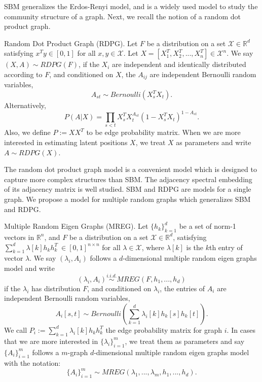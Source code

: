 \documentclass[10pt,journal,compsoc]{IEEEtran}
\newenvironment{definition}[1][Definition]{\begin{trivlist}
		\item[\hskip \labelsep {\bfseries #1}]}{\end{trivlist}}
\begin{document}
\noindent SBM generalizes the Erdos-Renyi model\cite{erdds1959random}, and is a widely used model to study the community structure of a graph\cite{karrer2011stochastic}\cite{lyzinski2015community}. Next, we recall the notion of a random dot product graph\cite{young2007random}. 

\begin{definition} Random Dot Product Graph (RDPG). Let $F$ be a distribution on a set $\mathcal{X} \in \mathbb{R}^d$ satisfying $x^T y \in [0, 1]$ for all $x, y \in \mathcal{X}$. Let $X=[X_1^T,X_2^T,...,X_n^T] \in \mathcal{X}^n$. We say $(X,A) \sim RDPG(F)$, if the $X_i$ are independent and identically distributed according to $F$, and conditioned on $X$, the $A_{ij}$ are independent Bernoulli random variables,
\[ A_{st} \sim Bernoulli(X_s^T X_t). \]
Alternatively,
\[ P(A|X) = \prod_{s<t} X_s^T X_t ^{ A_{st}} (1-X_s^T X_t)^{1- A_{st}}.\]
Also, we define $P:=XX^T$ to be edge probability matrix. When we are more interested in estimating latent positions $X$, we treat $X$ as parameters and write $A \sim RDPG(X)$.
\end{definition}
The random dot product graph model is a convenient model which is designed to capture more complex structures than SBM. The adjacency
spectral embedding of its adjacency matrix is well studied\cite{sussman2014consistent}. SBM and RDPG are models for a single graph. We propose a model for multiple random graphs which generalizes SBM and RDPG.
\begin{definition} Multiple Random Eigen Graphs (MREG). Let $\{h_k\}_{k=1}^{d}$ be a set of norm-1 vectors in $\mathbb{R}^{n}$, and  $F$ be a distribution on a set $\mathcal{X} \in \mathbb{R}^d$,  satisfying $\sum\limits_{k=1}^{d} \lambda [k] h_k  h_k^T \  \in [0, 1]^{n \times n} $ for all $\lambda \in \mathcal{X}$, where $\lambda[k]$ is the $k$th entry of vector $\lambda$. We say $(\lambda_i,A_i)$ follows a $d$-dimensional multiple random eigen graphs model and write
\[(\lambda_i,A_i) \overset{i.i.d.}{\sim} MREG(F,h_1,...,h_d)\]
if the $\lambda_i$ has distribution $F$, and conditioned on $\lambda_i$, the entries of $A_i$ are independent Bernoulli random variables,
\[ A_{i}[s,t] \sim Bernoulli( \sum_{k=1}^{d} \lambda_{i}[k] h_{k} [s] h_{k} [t] ). \]
We call $P_i:=\sum_{k=1}^{d} \lambda_i [k] h_k  h_k^T$ the edge probability matrix for graph $i$. In cases that we are more interested in $\{\lambda_i\}_{i=1}^m$, we treat them as parameters and say $\{A_i\}_{i=1}^{m}$ follows a $m$-graph $d$-dimensional multiple random eigen graphs model with the notation:
\[\{A_i\}_{i=1}^{m} \sim MREG(\lambda_1,...,\lambda_m,h_1,...,h_d).\] 
\end{definition}
\end{document}
